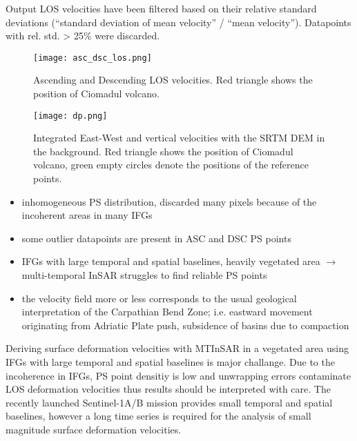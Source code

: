 \documentclass[a0, portrait]{a0poster}
\begin{document}
\begin{multicols}{2}


Output LOS velocities have been filtered based on their relative standard deviations (``standard deviation of mean velocity'' / ``mean velocity''). Datapoints with rel. std. > 25\% were discarded.

\begin{figure}[H]
    \centering
    \texttt{[image: asc\_dsc\_los.png]}
    \caption{Ascending and Descending LOS velocities. Red triangle shows the position of Ciomadul volcano.}
\end{figure}

\begin{figure}[H]
    \centering
    \texttt{[image: dp.png]}
    \caption{Integrated East-West and vertical velocities with the SRTM DEM in the background. Red triangle shows the position of Ciomadul volcano, green empty circles denote the positions of the reference points.}
\end{figure}

\begin{itemize}
    \item inhomogeneous PS distribution, \stamps discarded many pixels because of the incoherent areas in many IFGs
    \item some outlier datapoints are present in ASC and DSC PS points
    \item IFGs with large temporal and spatial baselines, heavily vegetated area $\rightarrow$ multi-temporal InSAR struggles to find reliable PS points
    \item the velocity field more or less corresponds to the usual geological interpretation of the Carpathian Bend Zone; i.e. eastward movement originating from Adriatic Plate push, subsidence of basins due to compaction
\end{itemize}



Deriving surface deformation velocities with MTInSAR in a vegetated area using IFGs with large temporal and spatial baselines is major challange. Due to the incoherence in IFGs, PS point densitiy is low and unwrapping errors contaminate LOS deformation velocities thus results should be interpreted with care. The recently launched Sentinel-1A/B mission provides small temporal and spatial baselines, however a long time series is required for the analysis of small magnitude surface deformation velocities.


\end{multicols}
\end{document}
